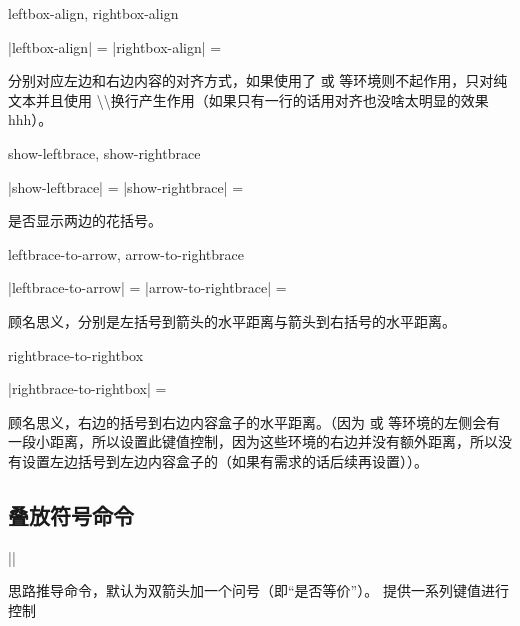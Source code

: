 \documentclass{xdyy-usermanual}
\begin{document}
\begin{function}[added = 2022-01-12]{leftbox-align, rightbox-align}
  \begin{syntax}
    |leftbox-align| =  
    |rightbox-align| =  
  \end{syntax}
  分别对应左边和右边内容的对齐方式，如果使用了  或  等环境则不起作用，只对纯文本并且使用 \textbackslash \textbackslash 换行产生作用（如果只有一行的话用对齐也没啥太明显的效果hhh）。
\end{function}

\begin{function}[added = 2022-01-12]{show-leftbrace, show-rightbrace}
  \begin{syntax}
    |show-leftbrace| =  
    |show-rightbrace| =  
  \end{syntax}
  是否显示两边的花括号。
\end{function}

\begin{function}[added = 2022-01-12]{leftbrace-to-arrow, arrow-to-rightbrace}
  \begin{syntax}
    |leftbrace-to-arrow| =  \init{7pt}
    |arrow-to-rightbrace| =  \init{2pt}
  \end{syntax}
  顾名思义，分别是左括号到箭头的水平距离与箭头到右括号的水平距离。
\end{function}

\begin{function}[added = 2022-01-12]{rightbrace-to-rightbox}
  \begin{syntax}
    |rightbrace-to-rightbox| =  \init{3mm}
  \end{syntax}
  顾名思义，右边的括号到右边内容盒子的水平距离。（因为  或  等环境的左侧会有一段小距离，所以设置此键值控制，因为这些环境的右边并没有额外距离，所以没有设置左边括号到左边内容盒子的（如果有需求的话后续再设置））。
\end{function}



\subsection{叠放符号命令 }

\begin{function}[added = 2022-2-21]{\overlay}
  \begin{syntax}
    |\overlay| 
  \end{syntax}
  思路推导命令，默认为双箭头加一个问号（即“是否等价”）。 提供一系列键值进行控制
  \begin{hexample}
      \overlay
  \end{hexample}
\end{function}
\end{document}
